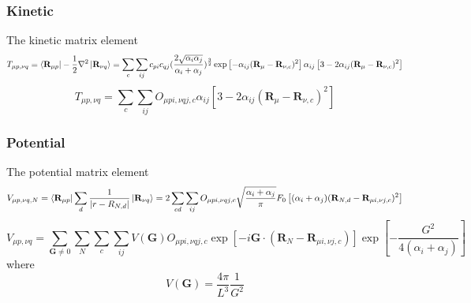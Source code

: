 \documentclass{article}
\begin{document}
        \subsubsection{Kinetic}
            The kinetic matrix element
            \begin{equation}
                T_{\mu p,\nu q} = \bra{\textbf{R}_{\mu p}}-\frac{1}{2}\nabla^2\ket{\textbf{R}_{\nu q}}
                = \sum_c\sum_{ij}c_{pi}c_{qj}(\frac{2\sqrt{\alpha_i\alpha_j}}{\alpha_i+\alpha_j})^{\frac{3}{2}}
                \exp\left[-\alpha_{ij}(\textbf{R}_{\mu}-\textbf{R}_{\nu,c})^2\right]
                \alpha_{ij}\left[3-2\alpha_{ij}(\textbf{R}_{\mu}-\textbf{R}_{\nu,c})^2\right]
            \end{equation}
            \begin{equation}
                T_{\mu p,\nu q} = \sum_c\sum_{ij}O_{\mu pi,\nu qj,c}
                \alpha_{ij}\left[3-2\alpha_{ij}(\textbf{R}_{\mu}-\textbf{R}_{\nu,c})^2\right]
            \end{equation}

        \subsubsection{Potential}
            The potential matrix element
            \begin{equation}
                V_{\mu p,\nu q,N} = \bra{\textbf{R}_{\mu p}}\sum_d\frac{1}{|r-R_{N,d}|}\ket{\textbf{R}_{\nu q}} 
                = 2 \sum_{cd}\sum_{ij}O_{\mu pi,\nu qj,c}\sqrt{\frac{\alpha_i+\alpha_j}{\pi}}
                F_0\left[(\alpha_i+\alpha_j)(\textbf{R}_{N,d}-\textbf{R}_{\mu i,\nu j,c})^2\right]
            \end{equation}
            \begin{equation}
                V_{\mu p,\nu q} = \sum_{\textbf{G}\neq 0}\sum_N\sum_c\sum_{ij}V(\textbf{G})O_{\mu pi,\nu qj,c}
                \exp\left[-i\textbf{G}\cdot(\textbf{R}_N-\textbf{R}_{\mu i,\nu j,c})\right]\exp\left[-\frac{G^2}{4(\alpha_i+\alpha_j)}\right]
            \end{equation}
            where
            \begin{equation}
                V(\textbf{G}) = \frac{4\pi}{L^3}\frac{1}{G^2}
            \end{equation}
\end{document}
